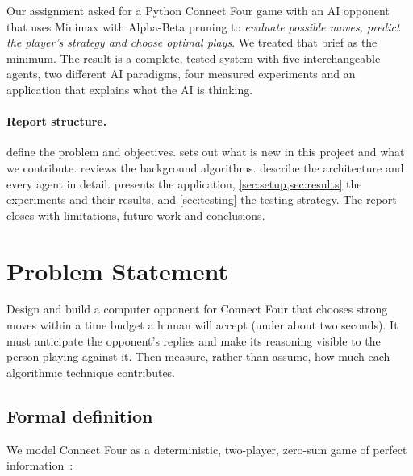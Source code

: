\documentclass[11pt,a4paper]{article}
\begin{document}
Our assignment asked for a Python Connect Four game with an AI opponent that uses Minimax with Alpha-Beta pruning to \emph{evaluate possible moves, predict the player's strategy and choose optimal plays}. We treated that brief as the minimum. The result is a complete, tested system with five interchangeable agents, two different AI paradigms, four measured experiments and an application that explains what the AI is thinking.

\paragraph{Report structure.}  define the problem and objectives.  sets out what is new in this project and what we contribute.  reviews the background algorithms.  describe the architecture and every agent in detail.  presents the application, \cref{sec:setup,sec:results} the experiments and their results, and \cref{sec:testing} the testing strategy. The report closes with limitations, future work and conclusions.

\section{Problem Statement}\label{sec:problem}

\begin{keybox}[title=Problem]
Design and build a computer opponent for Connect Four that chooses strong moves within a time budget a human will accept (under about two seconds). It must anticipate the opponent's replies and make its reasoning visible to the person playing against it. Then measure, rather than assume, how much each algorithmic technique contributes.
\end{keybox}

\subsection{Formal definition}
We model Connect Four as a deterministic, two-player, zero-sum game of perfect information~\cite{aima}:
\end{document}
